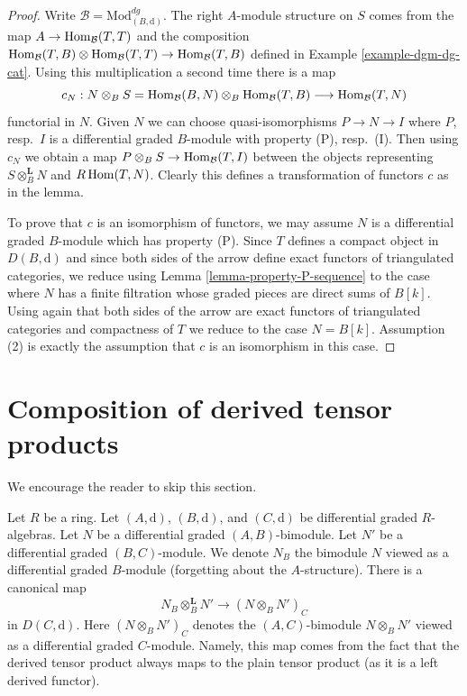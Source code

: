\begin{proof}
Write $\mathcal{B} = \text{Mod}^{dg}_{(B, \text{d})}$.
The right $A$-module structure on $S$ comes from the map
$A \to \mathop{\mathrm{Hom}}\nolimits_\mathcal{B}(T, T)$ and the composition
$\mathop{\mathrm{Hom}}\nolimits_\mathcal{B}(T, B) \otimes \mathop{\mathrm{Hom}}\nolimits_\mathcal{B}(T, T)
\to \mathop{\mathrm{Hom}}\nolimits_\mathcal{B}(T, B)$ defined in Example \ref{example-dgm-dg-cat}.
Using this multiplication a second time there is a map
$$
c_N :
N \otimes_B S = \mathop{\mathrm{Hom}}\nolimits_\mathcal{B}(B, N) \otimes_B \mathop{\mathrm{Hom}}\nolimits_\mathcal{B}(T, B)
\longrightarrow
\mathop{\mathrm{Hom}}\nolimits_\mathcal{B}(T, N)
$$
functorial in $N$. Given $N$ we can choose quasi-isomorphisms
$P \to N \to I$ where $P$, resp.\ $I$ is a differential graded $B$-module
with property (P), resp.\ (I). Then using $c_N$ we obtain a map
$P \otimes_B S \to \mathop{\mathrm{Hom}}\nolimits_\mathcal{B}(T, I)$ between the objects
representing $S \otimes_B^\mathbf{L} N$ and $R\mathop{\mathrm{Hom}}\nolimits(T, N)$.
Clearly this defines a transformation of functors $c$ as in the lemma.

\medskip\noindent
To prove that $c$ is an isomorphism of functors, we may
assume $N$ is a differential graded $B$-module which
has property (P). Since $T$ defines a compact object in
$D(B, \text{d})$ and since both sides of the arrow define
exact functors of triangulated categories, we reduce using
Lemma \ref{lemma-property-P-sequence}
to the case where $N$ has a finite filtration whose
graded pieces are direct sums of $B[k]$. Using again that
both sides of the arrow are exact functors of triangulated
categories and compactness of $T$ we reduce to
the case $N = B[k]$. Assumption (2) is exactly the
assumption that $c$ is an isomorphism in this case.
\end{proof}






\section{Composition of derived tensor products}
\label{section-compose-tensor-functors}

\noindent
We encourage the reader to skip this section.

\medskip\noindent
Let $R$ be a ring. Let $(A, \text{d})$, $(B, \text{d})$, and
$(C, \text{d})$ be differential graded $R$-algebras.
Let $N$ be a differential graded $(A, B)$-bimodule.
Let $N'$ be a differential graded $(B, C)$-module.
We denote $N_B$ the bimodule $N$ viewed as a differential graded
$B$-module (forgetting about the $A$-structure). There is a canonical map
\begin{equation}
\label{equation-plain-versus-derived}
N_B \otimes_B^\mathbf{L} N'
\longrightarrow
(N \otimes_B N')_C
\end{equation}
in $D(C, \text{d})$. Here $(N \otimes_B N')_C$ denotes the
$(A, C)$-bimodule $N \otimes_B N'$ viewed as a
differential graded $C$-module. Namely, this map
comes from the fact that the derived tensor product always maps to the
plain tensor product (as it is a left derived functor).

